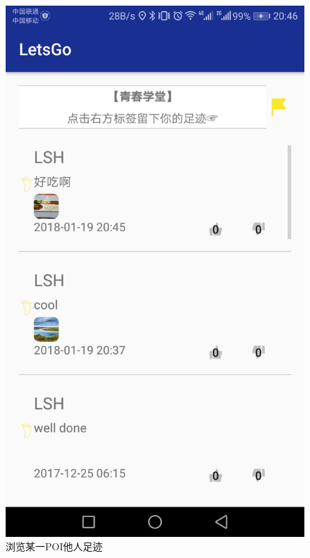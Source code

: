 \documentclass[UTF8]{article}
\begin{document}
\begin{figure}[H]
\begin{minipage}[t]{0.33\textwidth}
    \includegraphics[width=\textwidth]{images/demo_browse.jpeg}
    \caption{浏览某一POI他人足迹}
\end{minipage}
\end{figure}
\end{document}
